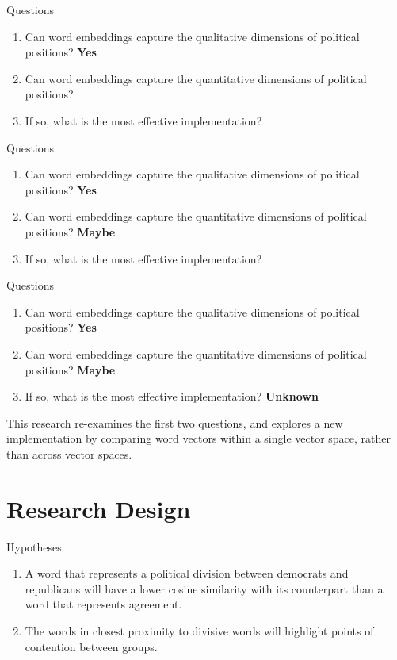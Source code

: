 \documentclass[10pt]{beamer}
\begin{document}
\begin{frame}{Questions}
  \begin{enumerate}
      \item Can word embeddings capture the qualitative dimensions of political positions? \textbf{Yes}
      \item Can word embeddings capture the quantitative dimensions of political positions?
      \item If so, what is the most effective implementation?
  \end{enumerate}    
\end{frame}

\begin{frame}{Questions}
  \begin{enumerate}
      \item Can word embeddings capture the qualitative dimensions of political positions? \textbf{Yes}
      \item Can word embeddings capture the quantitative dimensions of political positions? \textbf{Maybe}
      \item If so, what is the most effective implementation?
  \end{enumerate}    
\end{frame}

\begin{frame}{Questions}
  \begin{enumerate}
      \item Can word embeddings capture the qualitative dimensions of political positions? \textbf{Yes}
      \item Can word embeddings capture the quantitative dimensions of political positions? \textbf{Maybe}
      \item If so, what is the most effective implementation? \textbf{Unknown}
  \end{enumerate}
  This research re-examines the first two questions, and explores a new implementation by comparing word vectors within a single vector space, rather than across vector spaces.
\end{frame}

\section{Research Design}

\begin{frame}{Hypotheses}
    \begin{enumerate}
        \item A word that represents a political division between democrats and republicans will have a lower cosine similarity with its counterpart than a word that represents agreement.
        \item The words in closest proximity to divisive words will highlight points of contention 		between groups. 
    \end{enumerate}
\end{frame}
\end{document}
